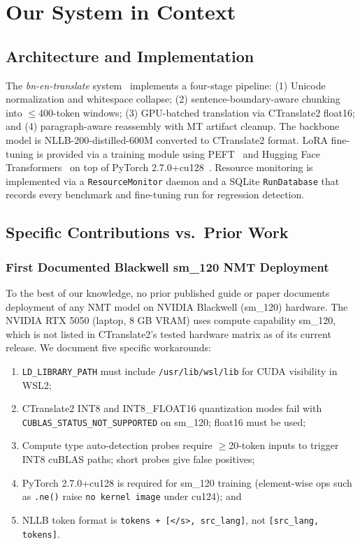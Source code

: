 \documentclass[conference]{IEEEtran}
\begin{document}
\section{Our System in Context}
\label{sec:ours}

\subsection{Architecture and Implementation}

The \textit{bn-en-translate} system~\cite{biswas2025bnentr} implements a
four-stage pipeline: (1) Unicode normalization and whitespace collapse;
(2) sentence-boundary-aware chunking into $\le$400-token windows;
(3) GPU-batched translation via CTranslate2 float16; and
(4) paragraph-aware reassembly with MT artifact cleanup.
The backbone model is NLLB-200-distilled-600M converted to CTranslate2
format.
LoRA fine-tuning is provided via a training module using PEFT~\cite{mangrulkar2022peft}
and Hugging Face Transformers~\cite{wolf2020transformers} on top of
PyTorch 2.7.0+cu128~\cite{paszke2019pytorch}.
Resource monitoring is implemented via a \texttt{ResourceMonitor} daemon
and a SQLite \texttt{RunDatabase} that records every benchmark and
fine-tuning run for regression detection.

\subsection{Specific Contributions vs.\ Prior Work}

\subsubsection{First Documented Blackwell sm\_120 NMT Deployment}
To the best of our knowledge, no prior published guide or paper documents
deployment of any NMT model on NVIDIA Blackwell (sm\_120) hardware.
The NVIDIA RTX 5050 (laptop, 8 GB VRAM) uses compute capability sm\_120,
which is not listed in CTranslate2's tested hardware matrix as of its
current release.
We document five specific workarounds:
\begin{enumerate}
  \item \texttt{LD\_LIBRARY\_PATH} must include \texttt{/usr/lib/wsl/lib}
    for CUDA visibility in WSL2;
  \item CTranslate2 INT8 and INT8\_FLOAT16 quantization modes fail with
    \texttt{CUBLAS\_STATUS\_NOT\_SUPPORTED} on sm\_120; float16 must be
    used;
  \item Compute type auto-detection probes require $\ge$20-token inputs
    to trigger INT8 cuBLAS paths; short probes give false positives;
  \item PyTorch 2.7.0+cu128 is required for sm\_120 training (element-wise
    ops such as \texttt{.ne()} raise \texttt{no kernel image} under
    cu124); and
  \item NLLB token format is \texttt{tokens + [</s>, src\_lang]}, not
    \texttt{[src\_lang, tokens]}.
\end{enumerate}
\end{document}
